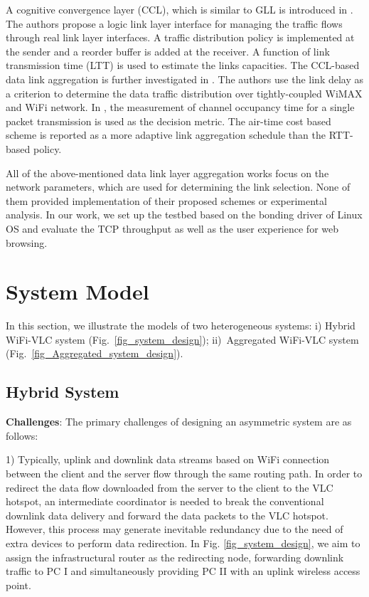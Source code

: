 \documentclass[10pt,journal]{IEEEtran}
\begin{document}
A cognitive convergence layer (CCL), which is similar to GLL is introduced in \cite{kim2008mac}. The authors propose a logic link layer interface for managing the traffic flows through real link layer interfaces. A traffic distribution policy is implemented at the sender and a reorder buffer is added at the receiver. A function of link transmission time (LTT) is used to estimate the links capacities. The CCL-based data link aggregation is further investigated in \cite{kim2010feedback}. The authors use the link delay as a criterion to determine the data traffic distribution over tightly-coupled WiMAX and WiFi network. In \cite{kim2012splitting}, the measurement of channel occupancy time for a single packet transmission is used as the decision metric. The air-time cost based scheme is reported as a more adaptive link aggregation schedule than the RTT-based policy.

All of the above-mentioned data link layer aggregation works focus on the network parameters, which are used for determining the link selection. None of them provided implementation of their proposed schemes or experimental analysis. In our work, we set up the testbed based on the bonding driver of Linux OS and evaluate the TCP throughput as well as the user experience for web browsing.

\section{System Model}\label{sec3}
In this section, we illustrate the models of two heterogeneous systems: i) Hybrid WiFi-VLC system (Fig.~\ref{fig_system_design}); ii)~Aggregated WiFi-VLC system (Fig.~\ref{fig_Aggregated_system_design}).

\subsection{Hybrid System}

\textbf{Challenges}: The primary challenges of designing an asymmetric system are as follows:

1) Typically, uplink and downlink data streams based on WiFi connection between the client and the server flow through the same routing path. In order to redirect the data flow downloaded from the server to the client to the VLC hotspot, an intermediate coordinator is needed to break the conventional downlink data delivery and forward the data packets to the VLC hotspot. However, this process may generate inevitable redundancy due to the need of extra devices to perform data redirection. In Fig. \ref{fig_system_design}, we aim to assign the infrastructural router as the redirecting node, forwarding downlink traffic to PC I and simultaneously providing PC II with an uplink wireless access point.
\end{document}
